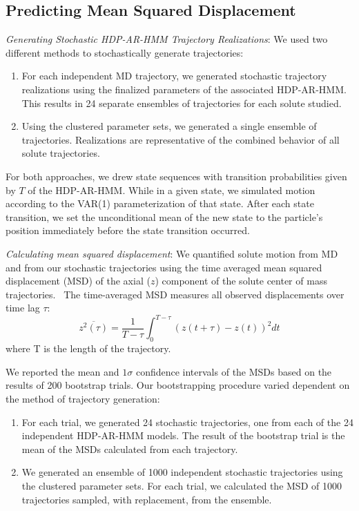 \documentclass[journal=jpcbfk,manuscript=article]{achemso}
\begin{document}
  \subsection{Predicting Mean Squared Displacement}\label{method:realizations}
  \textit{Generating Stochastic HDP-AR-HMM Trajectory Realizations}: We used two 
  different methods to stochastically generate trajectories:
  \begin{enumerate}[label={Method \theenumi :}, leftmargin=3.5\parindent]
    \item For each independent MD trajectory, we generated stochastic trajectory
    realizations using the finalized parameters of the associated HDP-AR-HMM. This 
    results in 24 separate ensembles of trajectories for each solute studied. 
    \item Using the clustered parameter sets, we generated a single ensemble
	of trajectories. Realizations are representative of the combined behavior
	of all solute trajectories.
  \end{enumerate}
  
  For both approaches, we drew state sequences with transition probabilities given 
  by $T$ of the HDP-AR-HMM. While in a given state, we simulated motion according to the 
  VAR(1) parameterization of that state. After each state transition, we set the 
  unconditional mean of the new state to the particle's position immediately before
  the state transition occurred.
  
  \textit{Calculating mean squared displacement}: We quantified solute motion from
  MD and from our stochastic trajectories using the time averaged mean squared 
  displacement (MSD) of the axial ($z$) component of the solute center of mass
  trajectories.~\cite{meroz_toolbox_2015} The time-averaged MSD measures all observed 
  displacements over time lag $\tau$:
  \begin{equation}
  	\overline{z^2(\tau)} = \dfrac{1}{T - \tau}\int_{0}^{T - \tau} (z(t + \tau) - z(t))^2 dt
  \label{eqn:tamsd}
  \end{equation}
  where T is the length of the trajectory. 
  
  We reported the mean and $1 \sigma$ confidence intervals of the MSDs based on the 
  results of 200 bootstrap trials. Our bootstrapping procedure varied dependent on the
  method of trajectory generation:
  \begin{enumerate}[label={Method \theenumi :}, leftmargin=3.5\parindent]
  	\item For each trial, we generated 24 stochastic trajectories, one from each of
  	the 24 independent HDP-AR-HMM models. The result of the bootstrap trial is the mean
  	of the MSDs calculated from each trajectory. 
    \item We generated an ensemble of 1000 independent stochastic trajectories using
    the clustered parameter sets. For each trial, we calculated the MSD of 1000 
    trajectories sampled, with replacement, from the ensemble.
  \end{enumerate}
  
\end{document}
